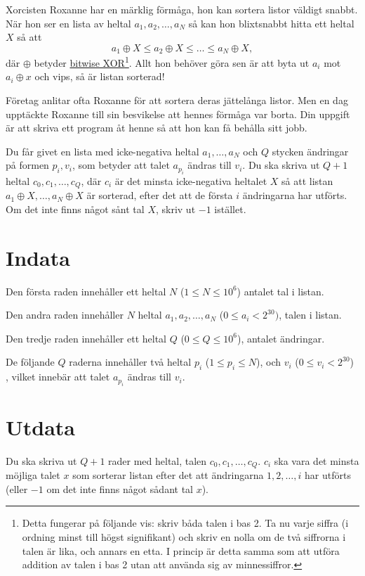 \noindent

Xorcisten Roxanne har en märklig förmåga, hon kan sortera listor väldigt snabbt.
När hon ser en lista av heltal $a_1, a_2, \dots, a_N$ så kan hon blixtsnabbt hitta ett heltal $X$ så att
$$
a_1 \oplus X \leq a_2 \oplus X \leq \dots \leq a_N \oplus X ,
$$
där $\oplus$ betyder \href{https://en.wikipedia.org/wiki/Bitwise\_operation\#XOR}{bitwise XOR}\footnote{Detta fungerar på följande vis: skriv båda talen i bas 2. Ta nu varje siffra (i ordning minst till högst signifikant) och skriv en nolla om de två siffrorna i talen är lika, och annars en etta. I princip är detta samma som att utföra addition av talen i bas 2 utan att använda sig av minnessiffror.}.
Allt hon behöver göra sen är att byta ut $a_i$ mot $a_i \oplus x$ och vips, så är listan sorterad!

Företag anlitar ofta Roxanne för att sortera deras jättelånga listor.
Men en dag upptäckte Roxanne till sin besvikelse att hennes förmåga var borta.
Din uppgift är att skriva ett program åt henne så att hon kan få behålla sitt jobb.

Du får givet en lista med icke-negativa heltal $a_1, \dots, a_N$ och $Q$ stycken ändringar på formen $p_i, v_i$, som betyder att talet $a_{p_i}$ ändras till $v_i$.
Du ska skriva ut $Q+1$ heltal $c_0, c_1, \dots, c_Q$, där $c_i$ är det minsta icke-negativa heltalet $X$ så att listan $a_1 \oplus X, \dots, a_N \oplus X$ är sorterad, efter det att de första $i$ ändringarna har utförts.
Om det inte finns något sånt tal $X$, skriv ut $-1$ istället.

\section*{Indata}
Den första raden innehåller ett heltal $N$ ($1 \leq N \leq 10^6$) antalet tal i listan.

Den andra raden innehåller $N$ heltal $a_1, a_2, \dots, a_N$ ($0 \leq a_i < 2^{30})$, talen i listan.

Den tredje raden innehåller ett heltal $Q$ ($0 \leq Q \leq 10^6$), antalet ändringar.

De följande $Q$ raderna innehåller två heltal $p_i$ ($1 \leq p_i \leq N$), och $v_i$ ($0 \leq v_i < 2^{30}$) , vilket innebär att talet $a_{p_i}$ ändras till $v_i$.

\section*{Utdata}
Du ska skriva ut $Q+1$ rader med heltal, talen $c_0, c_1, \dots, c_Q$. $c_i$ ska vara det minsta möjliga talet $x$ som sorterar listan efter det att ändringarna $1, 2, \dots, i$ har utförts (eller $-1$ om det inte finns något sådant tal $x$).

